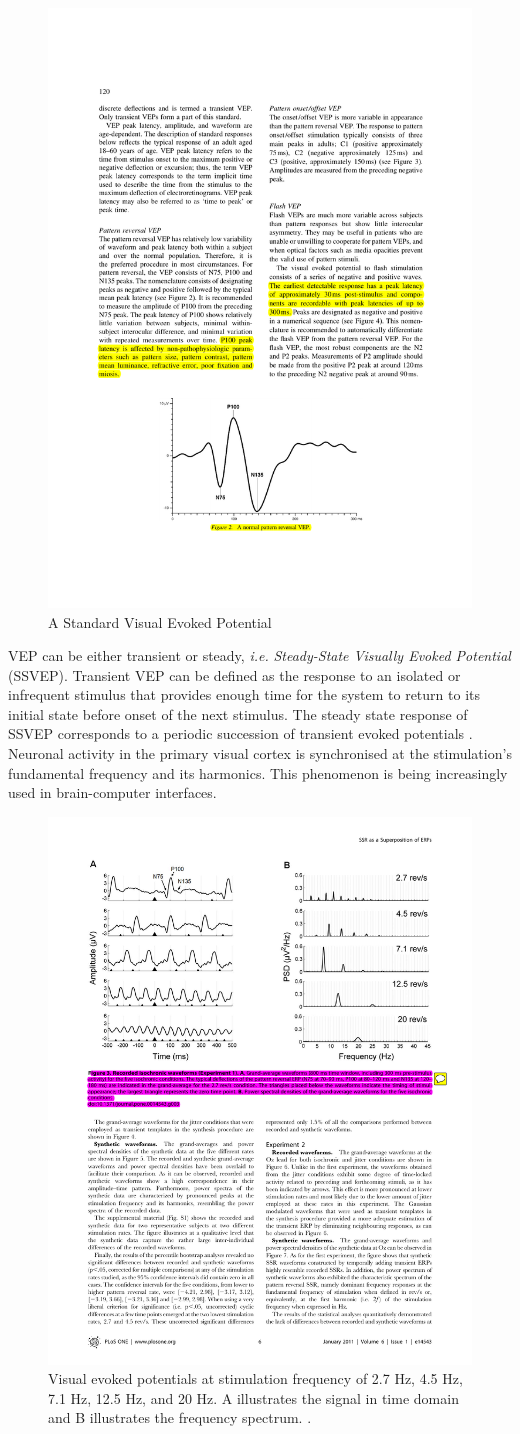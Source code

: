 \begin{figure}[!ht]
    \centering
    \includegraphics[width=0.5\columnwidth]{Figures/VEP.pdf}
    \caption{\footnotesize{A Standard Visual Evoked Potential} }
    \label{fig:VEP}
\end{figure}
\par

VEP can be either transient or steady, \textit{i.e.} \emph{Steady-State Visually Evoked Potential} (SSVEP). 
Transient VEP can be defined as the response to an isolated or infrequent stimulus that provides enough time for the system to return to its initial state before onset of the next stimulus.
The steady state response of SSVEP corresponds to a periodic succession of transient evoked potentials \citep{capilla_steady-state_2011}. 
Neuronal activity in the primary visual cortex is synchronised at the stimulation's fundamental frequency and its harmonics. 
This phenomenon is being increasingly used in brain-computer interfaces.  

\begin{figure}[!ht]
    \centering
    \includegraphics[width=0.5\columnwidth]{Figures/VEP-SSVEP.pdf}
    \caption{\footnotesize{Visual evoked potentials at stimulation frequency of 2.7 Hz, 4.5
            Hz, 7.1 Hz, 12.5 Hz, and 20 Hz. A illustrates the signal in time
            domain and B illustrates the frequency spectrum. \citep[Reproduced from][]{capilla_steady-state_2011} }. }
    \label{fig:VEP-SSVEP}
\end{figure}
\par

